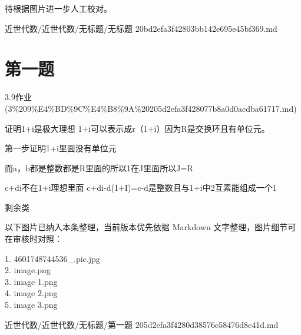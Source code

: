 \begin{homework}

待根据图片进一步人工校对。

\end{homework}

\begin{note}[来源路径]

近世代数/近世代数/无标题/无标题 20bd2efa3f42803bb142e695e45bf369.md

\end{note}

\section*{第一题}

\begin{note}[来源上级主题]

3.9作业 (3\%209\%E4\%BD\%9C\%E4\%B8\%9A\%20205d2efa3f428077b8a0d0acdba61717.md)

\end{note}

\begin{homework}

证明1+i是极大理想 1+i可以表示成r（1+i）因为R是交换环且有单位元。

第一步证明1+i里面没有单位元

而a，b都是整数都是R里面的所以1在J里面所以J=R

c+di不在1+i理想里面 c+di-d(1+I)=c-d是整数且与1+i中2互素能组成一个1

剩余类

\end{homework}

\begin{note}[关联图片]
以下图片已纳入本条整理，当前版本优先依据 Markdown 文字整理，图片细节可在审核时对照：

1. 4601748744536\_.pic.jpg\\
2. image.png\\
3. image 1.png\\
4. image 2.png\\
5. image 3.png\\

\end{note}

\begin{note}[来源路径]

近世代数/近世代数/无标题/第一题 205d2efa3f4280d38576e58476d8c41d.md

\end{note}

